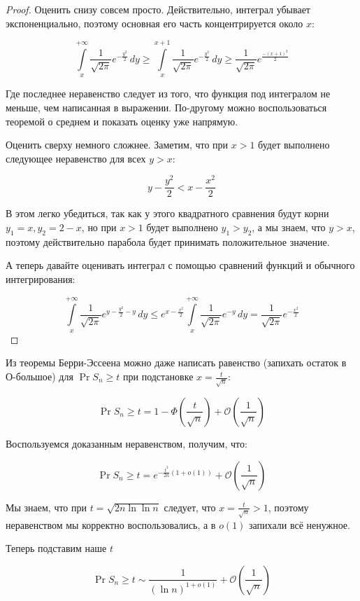 \begin{proof}
  Оценить снизу совсем просто. Действительно, интеграл убывает экспоненциально,
  поэтому основная его часть концентрируется около $x$:

  \[
    \int\limits_{x}^{+\infty} \frac{1}{\sqrt{2\pi}}e^{-\frac{y^2}{2}}\,dy
    \geq \int\limits_{x}^{x + 1} \frac{1}{\sqrt{2\pi}}e^{-\frac{y^2}{2}}\,dy
    \geq \frac{1}{\sqrt{2\pi}}e^{\frac{-(x + 1)^2}{2}}
  \]

  Где последнее неравенство следует из того, что функция под интегралом не меньше,
  чем написанная в выражении. По-другому можно воспользоваться теоремой о среднем
  и показать оценку уже напрямую.

  Оценить сверху немного сложнее. Заметим, что при $x > 1$ будет выполнено следующее
  неравенство для всех $y > x$:

  \[
    y - \frac{y^2}{2} < x - \frac{x^2}{2}
  \]

  В этом легко убедиться, так как у этого квадратного сравнения будут корни 
  $y_1 = x, y_2 = 2 - x$, но при $x > 1$ будет выполнено $y_1 > y_2$, а мы знаем,
  что $y > x$, поэтому действительно парабола будет принимать положительное значение.

  А теперь давайте оценивать интеграл с помощью сравнений функций и обычного
  интегрирования:

  \[
     \int\limits_{x}^{+\infty} \frac{1}{\sqrt{2\pi}}e^{y - \frac{y^2}{2} - y}\,dy
     \leq  e^{x - \frac{x^2}{2}}\int\limits_{x}^{+\infty} \frac{1}{\sqrt{2\pi}}e^{-y}\,dy
     = \frac{1}{\sqrt{2\pi}}e^{-\frac{x^2}{2}}
  \]
\end{proof}

Из теоремы Берри-Эссеена можно даже написать равенство (запихать остаток в О-большое)
для $\Pr{S_n \geq t}$ при подстановке $x = \frac{t}{\sqrt{n}}$:

\[
  \Pr{S_n \geq t} = 1 - \Phi\left(\frac{t}{\sqrt{n}}\right) + \mathcal{O}\left(\frac{1}{\sqrt{n}}\right)
\]

Воспользуемся доказанным неравенством, получим, что:

\[
  \Pr{S_n \geq t} = e^{-\frac{t^2}{2n}(1 + o(1))} + \mathcal{O}\left(\frac{1}{\sqrt{n}}\right)
\]

Мы знаем, что при $t = \sqrt{2n\ln\ln n}$ следует, что $x = \frac{t}{\sqrt{n}} > 1$,
поэтому неравенством мы корректно воспользовались, а в $o(1)$ запихали всё ненужное.

Теперь подставим наше $t$

\[
  \Pr{S_n \geq t} \sim \frac{1}{(\ln n)^{1 + o(1)}} + \mathcal{O}\left(\frac{1}{\sqrt{n}}\right)
\]

